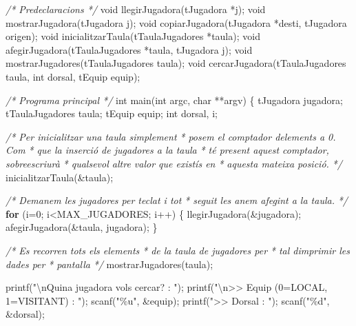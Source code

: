 \documentclass[
]{book}
\newenvironment{Shaded}{\begin{snugshade}}{\end{snugshade}}
\newcommand{\CommentTok}[1]{\textcolor[rgb]{0.56,0.35,0.01}{\textit{#1}}}
\newcommand{\ControlFlowTok}[1]{\textcolor[rgb]{0.13,0.29,0.53}{\textbf{#1}}}
\newcommand{\DataTypeTok}[1]{\textcolor[rgb]{0.13,0.29,0.53}{#1}}
\newcommand{\DecValTok}[1]{\textcolor[rgb]{0.00,0.00,0.81}{#1}}
\newcommand{\NormalTok}[1]{#1}
\newcommand{\SpecialCharTok}[1]{\textcolor[rgb]{0.00,0.00,0.00}{#1}}
\newcommand{\StringTok}[1]{\textcolor[rgb]{0.31,0.60,0.02}{#1}}
\begin{document}
\begin{Shaded}
\begin{Highlighting}[]
\CommentTok{/* Predeclaracions */}
\DataTypeTok{void}\NormalTok{ llegirJugadora(tJugadora *j);}
\DataTypeTok{void}\NormalTok{ mostrarJugadora(tJugadora j);}
\DataTypeTok{void}\NormalTok{ copiarJugadora(tJugadora *desti, tJugadora origen);}
\DataTypeTok{void}\NormalTok{ inicialitzarTaula(tTaulaJugadores *taula);}
\DataTypeTok{void}\NormalTok{ afegirJugadora(tTaulaJugadores *taula, tJugadora j);}
\DataTypeTok{void}\NormalTok{ mostrarJugadores(tTaulaJugadores taula);}
\DataTypeTok{void}\NormalTok{ cercarJugadora(tTaulaJugadores taula, }\DataTypeTok{int}\NormalTok{ dorsal, tEquip equip);}

\CommentTok{/* Programa principal */}
\DataTypeTok{int}\NormalTok{ main(}\DataTypeTok{int}\NormalTok{ argc, }\DataTypeTok{char}\NormalTok{ **argv) \{}
\NormalTok{    tJugadora jugadora;}
\NormalTok{    tTaulaJugadores taula;}
\NormalTok{    tEquip equip;}
    \DataTypeTok{int}\NormalTok{ dorsal, i;}
    
    \CommentTok{/* Per inicialitzar una taula simplement}
\CommentTok{     * posem el comptador d\textquotesingle{}elements a 0. Com}
\CommentTok{     * que la inserció de jugadores a la taula}
\CommentTok{     * té present aquest comptador, sobreescriurà}
\CommentTok{     * qualsevol altre valor que existís en }
\CommentTok{     * aquesta mateixa posició.}
\CommentTok{     */}
\NormalTok{    inicialitzarTaula(\&taula);}
    
    \CommentTok{/* Demanem les jugadores per teclat i tot}
\CommentTok{     * seguit les anem afegint a la taula.}
\CommentTok{     */}
    \ControlFlowTok{for}\NormalTok{ (i=}\DecValTok{0}\NormalTok{; i\textless{}MAX\_JUGADORES; i++) \{}
\NormalTok{        llegirJugadora(\&jugadora);}
\NormalTok{        afegirJugadora(\&taula, jugadora);}
\NormalTok{    \}}
    
    \CommentTok{/* Es recorren tots els elements}
\CommentTok{     * de la taula de jugadores per}
\CommentTok{     * tal d\textquotesingle{}imprimir les dades per }
\CommentTok{     * pantalla}
\CommentTok{     */}
\NormalTok{    mostrarJugadores(taula);}
    
\NormalTok{    printf(}\StringTok{"}\SpecialCharTok{\textbackslash{}n}\StringTok{Quina jugadora vols cercar? : "}\NormalTok{);}
\NormalTok{    printf(}\StringTok{"}\SpecialCharTok{\textbackslash{}n}\StringTok{\textgreater{}\textgreater{} Equip (0=LOCAL, 1=VISITANT) : "}\NormalTok{);}
\NormalTok{    scanf(}\StringTok{"\%u"}\NormalTok{, \&equip);}
\NormalTok{    printf(}\StringTok{"\textgreater{}\textgreater{} Dorsal : "}\NormalTok{);}
\NormalTok{    scanf(}\StringTok{"\%d"}\NormalTok{, \&dorsal);}
    

\end{Highlighting}
\end{Shaded}
\end{document}
